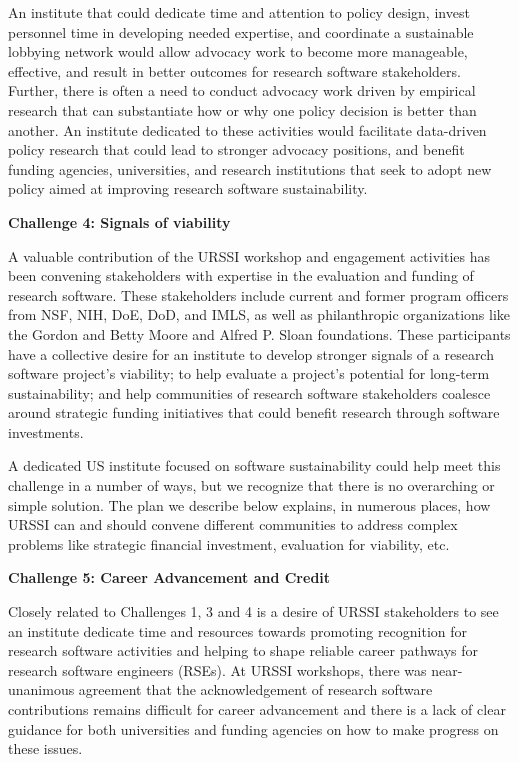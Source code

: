 \documentclass[
]{book}
\begin{document}
An institute that could dedicate time and attention to policy design, invest
personnel time in developing needed expertise, and coordinate a sustainable
lobbying network would allow advocacy work to become more manageable,
effective, and result in better outcomes for research software stakeholders.
Further, there is often a need to conduct advocacy work driven by
empirical research that can substantiate how or why one policy decision is
better than another. An institute dedicated to these activities would
facilitate data-driven policy research that could lead to stronger advocacy
positions, and benefit funding agencies, universities, and research
institutions that seek to adopt new policy aimed at improving research
software sustainability.

\textbf{Challenge 4: Signals of viability}

A valuable contribution of the URSSI workshop and engagement activities has
been convening stakeholders with expertise in the evaluation and funding of
research software. These stakeholders include current and former program officers
from NSF, NIH, DoE, DoD, and IMLS, as well as philanthropic organizations
like the Gordon and Betty Moore and Alfred P. Sloan foundations. These
participants have a collective desire for an institute to develop stronger
signals of a research software project's viability; to help evaluate a
project's potential for long-term sustainability; and help communities of
research software stakeholders coalesce around strategic funding initiatives
that could benefit research through software investments.

A dedicated US institute focused on software sustainability could help meet
this challenge in a number of ways, but we recognize that there is no
overarching or simple solution. The plan we describe below explains,
in numerous places, how URSSI can and should convene different communities
to address complex problems like strategic financial investment, evaluation
for viability, etc.

\textbf{Challenge 5: Career Advancement and Credit}

Closely related to Challenges 1, 3 and 4 is a desire of URSSI stakeholders to
see an institute dedicate time and resources towards promoting recognition
for research software activities and helping to shape reliable career pathways
for research software engineers (RSEs). At URSSI workshops, there was
near-unanimous agreement that the acknowledgement of research software
contributions remains difficult for career advancement and there is a lack
of clear guidance for both universities and funding agencies on how to make
progress on these issues.
\end{document}

